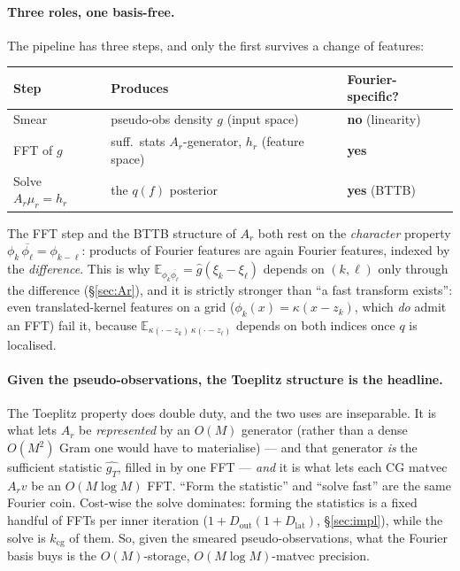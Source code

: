 \documentclass[11pt]{article}
\newcommand{\Eq}[1][q]{\mathbb{E}_{#1}}
\begin{document}
\paragraph{Three roles, one basis-free.}
The pipeline has three steps, and only the first survives a change of
features:
\begin{center}
\renewcommand{\arraystretch}{1.3}
\begin{tabular}{lll}
\toprule
Step & Produces & Fourier-specific? \\
\midrule
Smear & pseudo-obs density $g$ (input space) & \textbf{no} (linearity) \\
FFT of $g$ & suff.\ stats $A_r$-generator, $h_r$ (feature space) & \textbf{yes} \\
Solve $A_r\mu_r=h_r$ & the $q(f)$ posterior & \textbf{yes} (BTTB) \\
\bottomrule
\end{tabular}
\end{center}
The FFT step and the BTTB structure of $A_r$ both rest on the
\emph{character} property $\phi_k\,\overline{\phi_\ell}=\phi_{k-\ell}$:
products of Fourier features are again Fourier features, indexed by the
\emph{difference}.  This is why $\Eq[\phi_k\overline{\phi_\ell}]=
\widehat g(\xi_k-\xi_\ell)$ depends on $(k,\ell)$ only through the
difference (\S\ref{sec:Ar}), and it is strictly stronger than ``a fast
transform exists'': even translated-kernel features on a grid
($\phi_k(x)=\kappa(x-z_k)$, which \emph{do} admit an FFT) fail it,
because $\Eq[\kappa(\cdot-z_k)\,\kappa(\cdot-z_\ell)]$ depends on both
indices once $q$ is localised.

\paragraph{Given the pseudo-observations, the Toeplitz structure is the
headline.}
The Toeplitz property does double duty, and the two uses are
inseparable.  It is what lets $A_r$ be \emph{represented} by an $O(M)$
generator (rather than a dense $O(M^2)$ Gram one would have to
materialise) --- and that generator \emph{is} the sufficient statistic
$\widehat{g_T}$, filled in by one FFT --- \emph{and} it is what lets
each CG matvec $A_r v$ be an $O(M\log M)$ FFT.  ``Form the statistic''
and ``solve fast'' are the same Fourier coin.  Cost-wise the solve
dominates: forming the statistics is a fixed handful of FFTs per inner
iteration ($1+D_{\text{out}}(1+D_{\text{lat}})$, \S\ref{sec:impl}),
while the solve is $k_{\text{cg}}$ of them.  So, given the smeared
pseudo-observations, what the Fourier basis buys is the
$O(M)$-storage, $O(M\log M)$-matvec precision.
\end{document}

